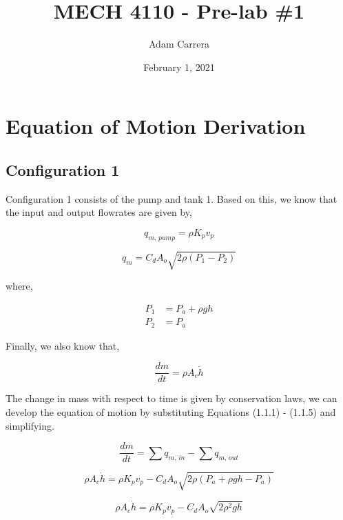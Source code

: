\documentclass[12pt]{article}
\author{Adam Carrera}
\date{February 1, 2021}
\title{MECH 4110 - Pre-lab \#1}
\numberwithin{equation}{subsection}
\begin{document}
  \maketitle

  \section{Equation of Motion Derivation}

  \subsection{Configuration 1}

  Configuration 1 consists of the pump and tank 1. Based on this, we know that the input and output flowrates are given by,

  \begin{equation}
    q_{m, \, pump} = \rho K_p v_p
  \end{equation}

  \begin{equation}
    q_m = C_d A_o \sqrt{2\rho \left( P_1 - P_2 \right)}
  \end{equation}

  where,

  \begin{align}
    P_1 &= P_a + \rho g h \\
    P_2 &= P_a
  \end{align}

  Finally, we also know that,

  \begin{equation}
    \frac{dm}{dt} = \rho A_c \dot h
  \end{equation}

  The change in mass with respect to time is given by conservation laws, we can develop the equation of motion by substituting Equations (1.1.1) - (1.1.5) and simplifying.

  \begin{equation}
    \frac{dm}{dt} = \sum q_{m, \, in} - \sum q_{m ,\, out}
  \end{equation}

  \begin{equation}
    \rho A_c \dot h = \rho K_p v_p - C_d A_o \sqrt{2\rho \left( P_a + \rho gh - P_a \right)}
  \end{equation}

  \begin{equation}
    \rho A_c \dot h = \rho K_p v_p - C_d A_o \sqrt{2\rho^2 gh}
  \end{equation}
\end{document}
